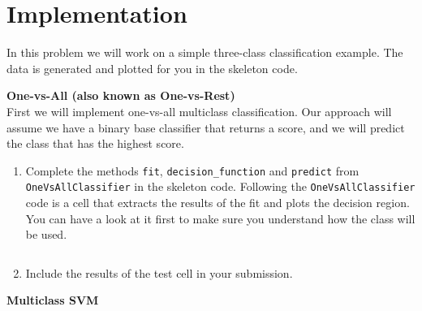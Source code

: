 \documentclass{article}
\newcommand{\nyuparagraph}[1]{\vspace{0.3cm}\textcolor{nyupurple}{\bf \large #1}\\}
\theoremstyle{plain}
\theoremstyle{definition}
\begin{document}
\section{Implementation}

In this problem we will work on a simple three-class classification
example.
The data is generated and plotted for you in the skeleton code. 

\nyuparagraph{One-vs-All (also known as One-vs-Rest)}

First we will implement one-vs-all multiclass classification.
Our approach will assume we have a binary base classifier that returns
a score, and we will predict the class that has the highest score. 
\begin{enumerate}
  \setcounter{enumi}{\value{saveenum}}
\item Complete the methods \texttt{fit}, \texttt{decision\_function} and \texttt{predict} from \texttt{OneVsAllClassifier}  in the skeleton code. Following
the \texttt{OneVsAllClassifier} code is a cell that extracts the results of
the fit and plots the decision region. You can have a look at it first to make sure you understand how the class will be used.
\begin{itemize}
    \color{blue}
           \inputminted[firstline=43, lastline=103, breaklines=True]{python}{hw_5.py}
\end{itemize}

\item  Include the results of the test cell in your submission.
\setcounter{saveenum}{\value{enumi}}
\end{enumerate}


\nyuparagraph{Multiclass SVM}
\end{document}

